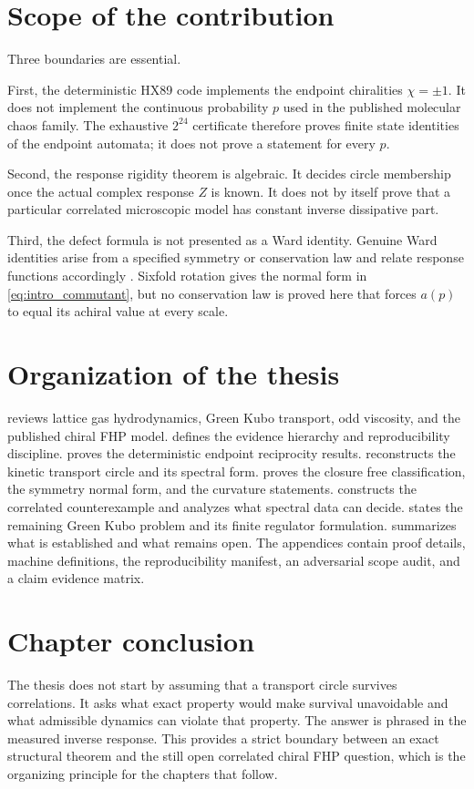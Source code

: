 \section{Scope of the contribution}
Three boundaries are essential.

First, the deterministic HX89 code implements the endpoint chiralities $\chi=\pm1$. It does not implement the continuous probability $p$ used in the published molecular chaos family. The exhaustive $2^{24}$ certificate therefore proves finite state identities of the endpoint automata; it does not prove a statement for every $p$.

Second, the response rigidity theorem is algebraic. It decides circle membership once the actual complex response $Z$ is known. It does not by itself prove that a particular correlated microscopic model has constant inverse dissipative part.

Third, the defect formula is not presented as a Ward identity. Genuine Ward identities arise from a specified symmetry or conservation law and relate response functions accordingly \cite{Bradlyn2012}. Sixfold rotation gives the normal form in \cref{eq:intro_commutant}, but no conservation law is proved here that forces $a(p)$ to equal its achiral value at every scale.

\section{Organization of the thesis}
 reviews lattice gas hydrodynamics, Green Kubo transport, odd viscosity, and the published chiral FHP model.  defines the evidence hierarchy and reproducibility discipline.  proves the deterministic endpoint reciprocity results.  reconstructs the kinetic transport circle and its spectral form.  proves the closure free classification, the symmetry normal form, and the curvature statements.  constructs the correlated counterexample and analyzes what spectral data can decide.  states the remaining Green Kubo problem and its finite regulator formulation.  summarizes what is established and what remains open. The appendices contain proof details, machine definitions, the reproducibility manifest, an adversarial scope audit, and a claim evidence matrix.

\section{Chapter conclusion}
The thesis does not start by assuming that a transport circle survives correlations. It asks what exact property would make survival unavoidable and what admissible dynamics can violate that property. The answer is phrased in the measured inverse response. This provides a strict boundary between an exact structural theorem and the still open correlated chiral FHP question, which is the organizing principle for the chapters that follow.

